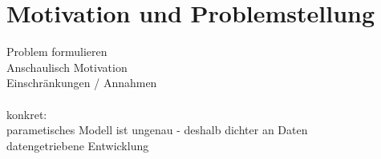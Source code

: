 \chapter{Motivation und Problemstellung}\label{ch:motivation}

Problem formulieren\\
Anschaulisch Motivation\\
Einschränkungen / Annahmen \\
\\
konkret:\\
parametisches Modell ist ungenau - deshalb dichter an Daten\\
datengetriebene Entwicklung \\


\begin{deprecated}
\cite{davis93}


\end{deprecated}
